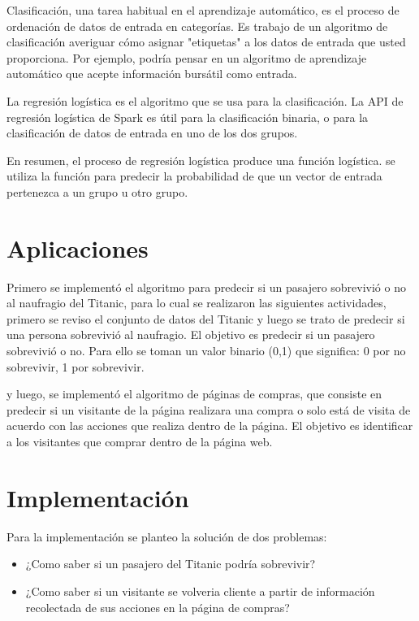 \documentclass{article}
\begin{document}
Clasificación, una tarea habitual en el aprendizaje automático, es el proceso de ordenación de datos de entrada en categorías. Es trabajo de un algoritmo de clasificación averiguar cómo asignar "etiquetas" a los datos de entrada que usted proporciona. Por ejemplo, podría pensar en un algoritmo de aprendizaje automático que acepte información bursátil como entrada. 

La regresión logística es el algoritmo que se usa para la clasificación. La API de regresión logística de Spark es útil para la clasificación binaria, o para la clasificación de datos de entrada en uno de los dos grupos. 

En resumen, el proceso de regresión logística produce una función logística. se utiliza la función para predecir la probabilidad de que un vector de entrada pertenezca a un grupo u otro grupo.


\section{Aplicaciones}

Primero se implementó el algoritmo para predecir si un pasajero sobrevivió o no al naufragio del Titanic, para lo cual se realizaron las siguientes actividades, primero se reviso el conjunto de datos del Titanic y luego se trato de predecir si una persona sobrevivió al naufragio. El objetivo es predecir si un pasajero sobrevivió o no. Para ello se toman un valor binario (0,1) que significa: 0 por no sobrevivir, 1 por sobrevivir.

y luego, se implementó el algoritmo de páginas de compras, que consiste en predecir si un visitante de la página realizara una compra o solo está de visita de acuerdo con las acciones que realiza dentro de la página. El objetivo es identificar a los visitantes que comprar dentro de la página web.


\section{Implementación}

Para la implementación se planteo la solución de dos problemas:
\begin{itemize}
    \item ¿Como saber si un pasajero del Titanic podría sobrevivir?
    \item ¿Como saber si un visitante se volveria cliente a partir de información recolectada de sus acciones en la página de compras?
\end{itemize}
\end{document}
